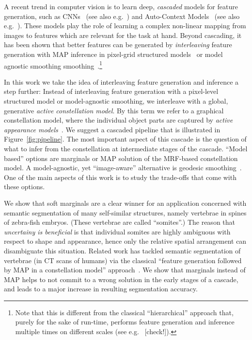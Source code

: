 \documentclass[10pt,twocolumn,letterpaper]{article}
\begin{document}
A recent trend in computer vision is to learn deep, \emph{cascaded} models for feature generation, such as CNNs~\cite{NIPS2012_4824} (see also e.g.\ \cite{funke2014candidate}) and Auto-Context Models~\cite{AutoContext2008} (see also e.g.\ \cite{PoseMachinesECCV2014}). 
%
These models play the role of learning a complex non-linear mapping from images to features which are relevant for the task at hand. 
%
Beyond cascading, it has been shown that better features can be generated by \emph{interleaving} feature generation with MAP inference in pixel-grid structured models~\cite{DTF,RTF,UweCVPR2013} 
%
or model agnostic smoothing smoothing~\cite{GeoForests2013}.\footnote{Note that this is different from the classical "`hierarchical"' approach that, purely for the sake of run-time, performs feature generation and inference multiple times on different scales (see e.g.\ \cite{CootesECCV2012RRFandSSM,CootesFemurTMI2013} [check!]).}

In this work we take the idea of interleaving feature generation and inference a step further: 
%
Instead of interleaving feature generation with a pixel-level structured model or model-agnostic smoothing, we interleave with a global, generative \emph{active constellation model}. By this term we refer to a graphical constellation model, where the individual object parts are captured by \emph{active appearance models}~\cite{CootesAAM2001}. 
%
We suggest a cascaded pipeline that is illustrated in Figure~\ref{fig:pipeline}. 
% 
The most important aspect of this cascade is the question of what to infer from the constellation at intermediate stages of the cascade. 
%
"`Model based"' options are marginals or MAP solution of the MRF-based constellation model. A model-agnostic, yet "`image-aware"' alternative is geodesic smoothing~\cite{GeoForests2013}. 
%
One of the main aspects of this work is to study the trade-offs that come with these options. 

We show that soft marginals are a clear winner for an application concerned with semantic segmentation of many self-similar structures, namely vertebrae in spines of zebra-fish embryos. 
%
(These vertebrae are called "`somites"'.) 
%
The reason that \emph{uncertainy is beneficial} is that individual somites are highly ambiguous with respect to shape and appearance, hence only the relative spatial arrangement can disambiguate this situation. 
%
Related work has tackled semantic segmentation of vertebrae (in CT scans of humans) via the classical "`feature generation followed by MAP in a constellation model"' approach~\cite{Glocker2013}.
%
We show that marginals instead of MAP helps to not commit to a wrong solution in the early stages of a cascade, and leads to a major increase in resulting segmentation accuracy. 
\end{document}
